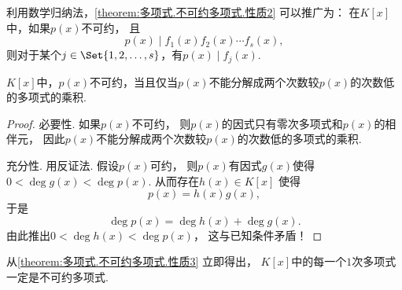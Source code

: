 利用数学归纳法，\cref{theorem:多项式.不可约多项式.性质2} 可以推广为：
在\(K[x]\)中，如果\(p(x)\)不可约，
且\[
	p(x) \mid f_1(x) f_2(x) \dotsm f_s(x),
\]
则对于某个\(j \in \Set{1,2,\dotsc,s}\)，有\(p(x) \mid f_j(x)\).

\begin{property}\label{theorem:多项式.不可约多项式.性质3}
\(K[x]\)中，\(p(x)\)不可约，当且仅当\(p(x)\)不能分解成两个次数较\(p(x)\)的次数低的多项式的乘积.
\begin{proof}
必要性.
如果\(p(x)\)不可约，
则\(p(x)\)的因式只有零次多项式和\(p(x)\)的相伴元，
因此\(p(x)\)不能分解成两个次数较\(p(x)\)的次数低的多项式的乘积.

充分性.
用反证法.
假设\(p(x)\)可约，
则\(p(x)\)有因式\(g(x)\)使得\(0<\deg g(x)<\deg p(x)\).
从而存在\(h(x) \in K[x]\)
使得\[
	p(x) = h(x) g(x),
\]
于是\[
	\deg p(x) = \deg h(x) + \deg g(x).
\]
由此推出\(0<\deg h(x)<\deg p(x)\)，
这与已知条件矛盾！
\end{proof}
\end{property}

从\cref{theorem:多项式.不可约多项式.性质3} 立即得出，
\(K[x]\)中的每一个\(1\)次多项式一定是不可约多项式.

